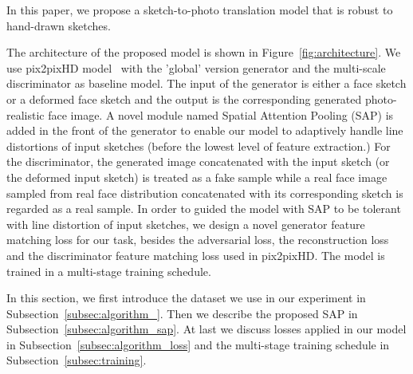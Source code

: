 % 




In this paper, we propose a sketch-to-photo translation model that is robust to hand-drawn sketches.

The architecture of the proposed model is shown in Figure~\ref{fig:architecture}. We use pix2pixHD model~\cite{pix2pixHD} with the 'global' version generator and the multi-scale discriminator as baseline model. The input of the generator is either a face sketch or a deformed face sketch and the output is the corresponding generated photo-realistic face image. A novel module named Spatial Attention Pooling (SAP) is added in the front of the generator to enable our model to adaptively handle line distortions of input sketches \td(before the lowest level of feature extraction.) 
%
For the discriminator, the generated image concatenated with the input sketch (or the deformed input sketch) is treated as a fake sample while a real face image sampled from real face distribution concatenated with its corresponding sketch is regarded as a real sample. 
%
%
In order to guided the model with SAP to be tolerant with line distortion of input sketches, we design a novel generator feature matching loss for our task, besides the adversarial loss, the reconstruction loss and the discriminator feature matching loss used in pix2pixHD. The model is trained in a multi-stage training schedule.
%

In this section, we first introduce the dataset we use in our experiment in Subsection~\ref{subsec:algorithm_}. Then we describe the proposed SAP in Subsection~\ref{subsec:algorithm_sap}. At last we discuss losses applied in our model in Subsection~\ref{subsec:algorithm_loss} and the multi-stage training schedule in Subsection~\ref{subsec:training}.

